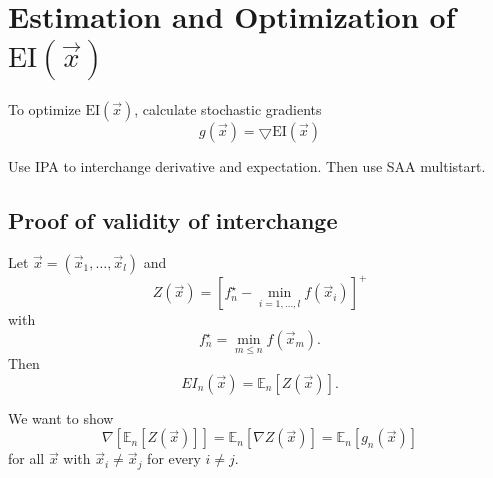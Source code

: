\documentclass[phd,tocprelim]{cornell}
\begin{document}
\section{Estimation and Optimization of $\mbox{EI}(\vec{x})$}

To optimize $\mbox{EI}(\vec{x})$, calculate stochastic gradients
\begin{equation}
 g(\vec{x}) = \bigtriangledown \mbox{EI}(\vec{x})
\end{equation}

Use IPA to interchange derivative and expectation. Then use SAA multistart.

\subsection{Proof of validity of interchange}

Let $\vec{x} = \left(\vec{x}_{1}, \ldots, \vec{x}_{l}\right)$ and
\begin{equation}
    Z \left(\vec{x}\right) = \left[f_{n}^{\star} - \min_{i = 1,\ldots,l} f \left(\vec{x}_{i}\right)\right]^{+}
\end{equation}
with
\begin{equation}
    f_{n}^{\star} = \min_{m\leq n} f \left(\vec{x}_{m}\right).
\end{equation}
Then
\begin{equation}
    EI_{n}(\vec{x}) = \mathbb{E}_{n}\left[Z \left(\vec{x}\right)\right].
\end{equation}

We want to show
\begin{equation}
    \nabla \left[\mathbb{E}_{n}\left[Z \left(\vec{x}\right)\right]\right] = \mathbb{E}_{n}\left[\nabla Z \left(\vec{x}\right)\right] =  \mathbb{E}_{n}\left[g_{n}(\vec{x})\right]
\end{equation}
for all $\vec{x}$ with $\vec{x}_{i} \neq \vec{x}_{j}$ for every $i \neq j$.
\end{document}
